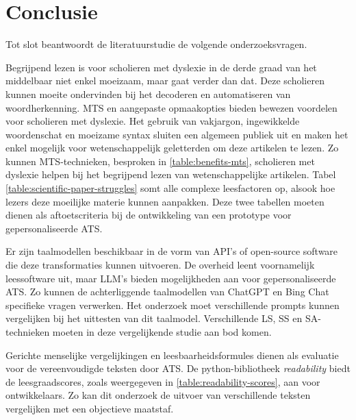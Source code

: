 \section{Conclusie}

Tot slot beantwoordt de literatuurstudie de volgende onderzoeksvragen.


Begrijpend lezen is voor scholieren met dyslexie in de derde graad van het middelbaar niet enkel moeizaam, maar gaat verder dan dat. Deze scholieren kunnen moeite ondervinden bij het decoderen en automatiseren van woordherkenning. MTS en aangepaste opmaakopties bieden bewezen voordelen voor scholieren met dyslexie. Het gebruik van vakjargon, ingewikkelde woordenschat en moeizame syntax sluiten een algemeen publiek uit en maken het enkel mogelijk voor wetenschappelijk geletterden om deze artikelen te lezen. Zo kunnen MTS-technieken, besproken in \ref{table:benefits-mts}, scholieren met dyslexie helpen bij het begrijpend lezen van wetenschappelijke artikelen. Tabel \ref{table:scientific-paper-struggles} somt alle complexe leesfactoren op, alsook hoe lezers deze moeilijke materie kunnen aanpakken. Deze twee tabellen moeten dienen als aftoetscriteria bij de ontwikkeling van een prototype voor gepersonaliseerde ATS. 

\medspace

Er zijn taalmodellen beschikbaar in de vorm van API's of open-source software die deze transformaties kunnen uitvoeren. De overheid leent voornamelijk leessoftware uit, maar LLM's bieden mogelijkheden aan voor gepersonaliseerde ATS. Zo kunnen de achterliggende taalmodellen van ChatGPT en Bing Chat specifieke vragen verwerken. Het onderzoek moet verschillende prompts kunnen vergelijken bij het uittesten van dit taalmodel. Verschillende LS, SS en SA-technieken moeten in deze vergelijkende studie aan bod komen. 

\medspace

Gerichte menselijke vergelijkingen en leesbaarheidsformules dienen als evaluatie voor de vereenvoudigde teksten door ATS. De python-bibliotheek \textit{readability} biedt de leesgraadscores, zoals weergegeven in \ref{table:readability-scores}, aan voor ontwikkelaars. Zo kan dit onderzoek de uitvoer van verschillende teksten vergelijken met een objectieve maatstaf.

